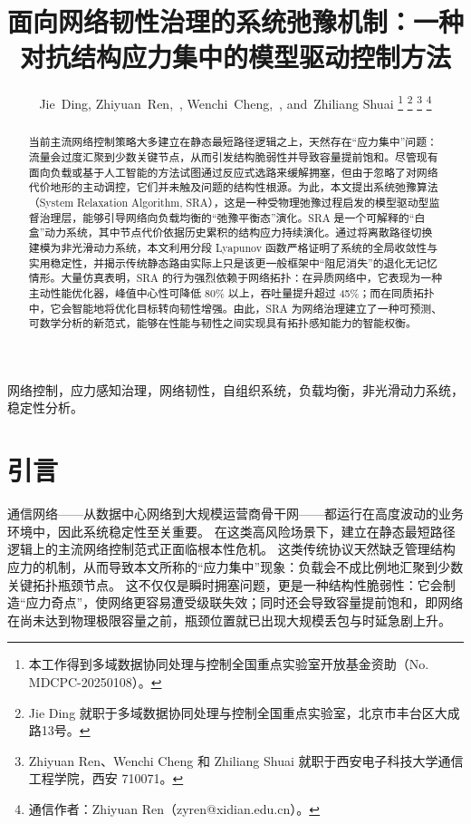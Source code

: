 \documentclass[journal]{IEEEtran}
\theoremstyle{plain}
\theoremstyle{definition}
\begin{document}
\title{面向网络韧性治理的系统弛豫机制：一种对抗结构应力集中的模型驱动控制方法}

\author{Jie~Ding,
       Zhiyuan~Ren,~,
       Wenchi~Cheng,~,
       and~Zhiliang Shuai
\thanks{本工作得到多域数据协同处理与控制全国重点实验室开放基金资助（No. MDCPC-20250108）。}
\thanks{Jie Ding 就职于多域数据协同处理与控制全国重点实验室，北京市丰台区大成路13号。}
\thanks{Zhiyuan Ren、Wenchi Cheng 和 Zhiliang Shuai 就职于西安电子科技大学通信工程学院，西安 710071。}
\thanks{通信作者：Zhiyuan Ren（zyren@xidian.edu.cn）。}
}

\maketitle

\begin{abstract}
当前主流网络控制策略大多建立在静态最短路径逻辑之上，天然存在“应力集中”问题：流量会过度汇聚到少数关键节点，从而引发结构脆弱性并导致容量提前饱和。尽管现有面向负载或基于人工智能的方法试图通过反应式选路来缓解拥塞，但由于忽略了对网络代价地形的主动调控，它们并未触及问题的结构性根源。为此，本文提出系统弛豫算法（System Relaxation Algorithm, SRA），这是一种受物理弛豫过程启发的模型驱动型监督治理层，能够引导网络向负载均衡的“弛豫平衡态”演化。SRA 是一个可解释的“白盒”动力系统，其中节点代价依据历史累积的结构应力持续演化。通过将离散路径切换建模为非光滑动力系统，本文利用分段 Lyapunov 函数严格证明了系统的全局收敛性与实用稳定性，并揭示传统静态路由实际上只是该更一般框架中“阻尼消失”的退化无记忆情形。大量仿真表明，SRA 的行为强烈依赖于网络拓扑：在异质网络中，它表现为一种主动性能优化器，峰值中心性可降低 80\% 以上，吞吐量提升超过 45\%；而在同质拓扑中，它会智能地将优化目标转向韧性增强。由此，SRA 为网络治理建立了一种可预测、可数学分析的新范式，能够在性能与韧性之间实现具有拓扑感知能力的智能权衡。
\end{abstract}

\begin{IEEEkeywords}
网络控制，应力感知治理，网络韧性，自组织系统，负载均衡，非光滑动力系统，稳定性分析。
\end{IEEEkeywords}

\section{引言}
\label{sec:introduction}

通信网络——从数据中心网络到大规模运营商骨干网——都运行在高度波动的业务环境中，因此系统稳定性至关重要。
在这类高风险场景下，建立在静态最短路径逻辑上的主流网络控制范式正面临根本性危机。
这类传统协议天然缺乏管理结构应力的机制，从而导致本文所称的“应力集中”现象：负载会不成比例地汇聚到少数关键拓扑瓶颈节点。
这不仅仅是瞬时拥塞问题，更是一种结构性脆弱性：它会制造“应力奇点”，使网络更容易遭受级联失效；同时还会导致容量提前饱和，即网络在尚未达到物理极限容量之前，瓶颈位置就已出现大规模丢包与时延急剧上升。
\end{document}
